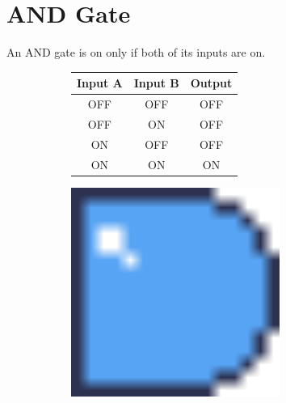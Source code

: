 \documentclass[12pt]{book}
\newcommand{\ON}{\textcolor{on}{ON}}
\newcommand{\OFF}{\textcolor{off}{OFF}}
\begin{document}
		\section{AND Gate}
			An AND gate is on only if both of its inputs are on.
			\begin{figure}[h]
				\centering
				\begin{subfigure}{0.75\textwidth}
					\begin{tabular}{|c|c|c|}
						\hline
						\textbf{Input A} & \textbf{Input B} & \textbf{Output}\\\hline
						\OFF & \OFF & \OFF\\\hline
						\OFF & \ON & \OFF\\\hline
						\ON & \OFF & \OFF\\\hline
						\ON & \ON & \ON\\\hline
					\end{tabular}
				\end{subfigure}
				\begin{subfigure}{0.2\textwidth}
					\centering
					\includegraphics[width=0.75\textwidth]{AND}
				\end{subfigure}
			\end{figure}
		\vspace{-20pt}
\end{document}
